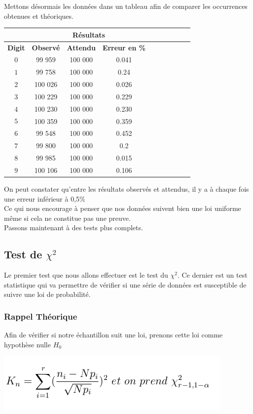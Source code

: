 \documentclass[french]{article}
\begin{document}
\newpage
Mettons désormais les données dans un tableau afin de comparer les occurrences obtenues et théoriques.
\begin{longtable}{|c|c|c|c|c|c|c|c|c|c|}
	\hline
	& \multicolumn{3}{c|}{\textbf{Résultats}} \\ 
	\hline 
	\textbf{Digit}  & \textbf{Observé} & \textbf{Attendu} & \textbf{Erreur en \%} \\ 
	\hline 
	$$0$$ & 99 959 & 100 000 & 0.041\\ 
	\hline 
	$$1$$ & 99 758 & 100 000 & 0.24\\ 
	\hline 
	$$2$$ & 100 026 & 100 000 & 0.026 \\ 
	\hline 
	$$3$$ & 100 229 & 100 000 & 0.229\\ 
	\hline 
	$$4$$ & 100 230 & 100 000 & 0.230\\ 
	\hline 
	$$5$$ & 100 359 & 100 000 & 0.359\\ 
	\hline 
	$$6$$ & 99 548 & 100 000 & 0.452\\ 
	\hline 
	$$7$$ & 99 800 & 100 000 & 0.2\\ 
	\hline 
	$$8$$ & 99 985 & 100 000 & 0.015\\ 
	\hline 
	$$9$$ & 100 106 & 100 000 & 0.106\\ 
	\hline
\end{longtable}

On peut constater qu'entre les résultats observés et attendus, il y a à chaque fois une
erreur inférieur à 0,5\%
\\
Ce qui nous encourage à penser que nos données suivent bien une loi uniforme même si cela ne 
constitue pas une preuve.
\\
Passons maintenant à des tests plus complets.
\\
\subsection{Test de $\chi^{2}$ }
\label{testchi}
Le premier test que nous allons effectuer est le test du \textbf{$\chi^{2}$}. Ce dernier est un test statistique qui va permettre de vérifier si une série de données est susceptible de suivre une loi de probabilité.
\\

\subsubsection{Rappel Théorique}
Afin de vérifier si notre échantillon suit une loi, prenons cette loi comme hypothèse nulle \textit{$H_{0}$}
	\begin{center}
		\includegraphics[scale=0.60]{Archives/Images/khi2}
	\end{center}
		
\end{document}
